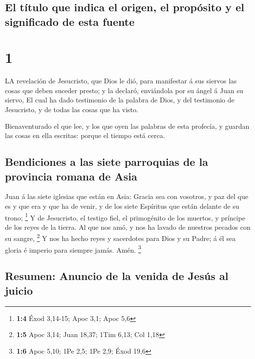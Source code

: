 \hypertarget{el-tuxedtulo-que-indica-el-origen-el-propuxf3sito-y-el-significado-de-esta-fuente}{%
\subsection{El título que indica el origen, el propósito y el
significado de esta
fuente}\label{el-tuxedtulo-que-indica-el-origen-el-propuxf3sito-y-el-significado-de-esta-fuente}}

\hypertarget{section}{%
\section{1}\label{section}}

 LA revelación de Jesucristo, que Dios le dió, para
manifestar á sus siervos las cosas que deben suceder presto; y la
declaró, enviándola por su ángel á Juan su siervo,  El cual
ha dado testimonio de la palabra de Dios, y del testimonio de
Jesucristo, y de todas las cosas que ha visto.

 Bienaventurado el que lee, y los que oyen las palabras de
esta profecía, y guardan las cosas en ella escritas: porque el tiempo
está cerca.

\hypertarget{bendiciones-a-las-siete-parroquias-de-la-provincia-romana-de-asia}{%
\subsection{Bendiciones a las siete parroquias de la provincia romana de
Asia}\label{bendiciones-a-las-siete-parroquias-de-la-provincia-romana-de-asia}}

 Juan á las siete iglesias que están en Asia: Gracia sea con
vosotros, y paz del que es y que era y que ha de venir, y de los siete
Espíritus que están delante de su trono; \footnote{\textbf{1:4} Éxod
  3,14-15; Apoc 3,1; Apoc 5,6}  Y de Jesucristo, el testigo
fiel, el primogénito de los muertos, y príncipe de los reyes de la
tierra. Al que nos amó, y nos ha lavado de nuestros pecados con su
sangre, \footnote{\textbf{1:5} Apoc 3,14; Juan 18,37; 1Tim 6,13; Col
  1,18}  Y nos ha hecho reyes y sacerdotes para Dios y su
Padre; á él sea gloria é imperio para siempre jamás. Amén. \footnote{\textbf{1:6}
  Apoc 5,10; 1Pe 2,5; 1Pe 2,9; Éxod 19,6}

\hypertarget{resumen-anuncio-de-la-venida-de-jesuxfas-al-juicio}{%
\subsection{Resumen: Anuncio de la venida de Jesús al
juicio}\label{resumen-anuncio-de-la-venida-de-jesuxfas-al-juicio}}

